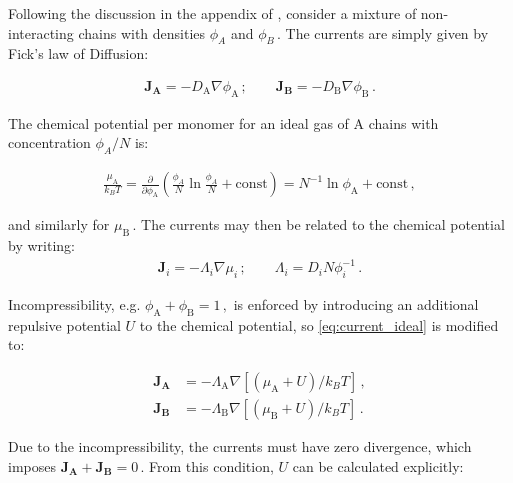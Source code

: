 \documentclass[bachelor,       %
               twoside,        %
               BCOR10mm,       %
                ngerman,english  %
               ]{GAUBM}
\begin{document}






Following the discussion in the appendix of \cite{deGennes80}, consider a mixture of non-interacting chains with densities $\phi_A$ and $\phi_B\,.$ The currents are simply given by Fick's law of Diffusion:

\begin{align}
  \mathbf{J_A}=-D_\mathrm A\nabla\phi_\mathrm A\,; \qquad \mathbf{J_B}=-D_\mathrm B\nabla\phi_\mathrm B\,.
\end{align}

The chemical potential per monomer for an ideal gas of A chains with concentration $\phi_A/N$ is:

\begin{align}
  \frac{\mu_\mathrm A}{k_BT}=\frac{\partial}{\partial\phi_\mathrm A}\left(\frac{\phi_A}{N}\ln\frac{\phi_A}{N}+\mathrm{const}\right)=N^{-1}\ln\phi_\mathrm A +\mathrm{const}\,,
\end{align}

and similarly for $\mu_\mathrm B\,.$ The currents may then be related to the chemical potential by writing:
\begin{align}
  \mathbf{J}_i=-\Lambda_i\nabla\mu_i\,; \qquad \Lambda_i=D_iN\phi_i^{-1}\,.
  \label{eq:current_ideal}
\end{align}

Incompressibility, e.g. $\phi_\mathrm A+\phi_\mathrm B=1\,,$ is enforced by introducing an additional repulsive potential $U$ to the chemical potential, so \eqref{eq:current_ideal} is modified to:

\begin{subequations}
  \begin{align}
    \mathbf{J_A}&=-\Lambda_\mathrm A\nabla [(\mu_\mathrm A + U)/k_BT]\,,\\
    \mathbf{J_B}&=-\Lambda_\mathrm B\nabla [(\mu_\mathrm B + U)/k_BT]\,.
  \end{align}
  \label{eq:current_onsager}
\end{subequations}

Due to the incompressibility, the currents must have zero divergence, which imposes $\mathbf{J_A}+\mathbf{J_B}=0\,.$ From this condition, $U$ can be calculated explicitly:
\end{document}
